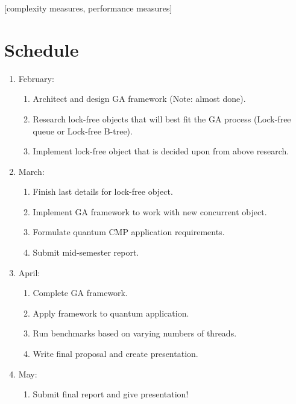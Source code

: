 \documentclass{acm_proc_article-sp}
\begin{document}
[complexity measures, performance measures]



%
%
\section{Schedule}
\begin{enumerate}

\item{
February:
}
\begin{enumerate}
\item Architect and design GA framework (Note: almost done).
\item Research lock-free objects that will best fit the GA process (Lock-free queue or Lock-free B-tree).
\item Implement lock-free object that is decided upon from above research.
\end{enumerate}

\item{
March:
}
\begin{enumerate}
\item Finish last details for lock-free object.
\item Implement GA framework to work with new concurrent object.
\item Formulate quantum CMP application requirements.
\item Submit mid-semester report.
\end{enumerate}


\item{
April:
}
\begin{enumerate}
\item Complete GA framework.
\item Apply framework to quantum application.
\item Run benchmarks based on varying numbers of threads.
\item Write final proposal and create presentation.
\end{enumerate}


\item{
May:
}
\begin{enumerate}
\item Submit final report and give presentation!
\end{enumerate}


\end{enumerate}
\end{document}
